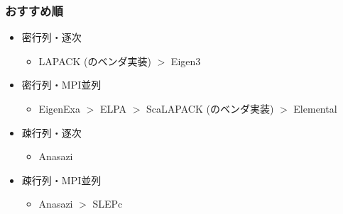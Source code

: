 \begin{frame}
  \frametitle{おすすめ順}
  \begin{itemize}
  \item 密行列・逐次
    \begin{itemize}
      \item LAPACK (のベンダ実装) $>$ Eigen3
    \end{itemize}
  \item 密行列・MPI並列
    \begin{itemize}
      \item EigenExa $>$ ELPA $>$ ScaLAPACK (のベンダ実装) $>$ Elemental
    \end{itemize}
  \item 疎行列・逐次
    \begin{itemize}
      \item Anasazi
    \end{itemize}
  \item 疎行列・MPI並列
    \begin{itemize}
      \item Anasazi $>$ SLEPc
    \end{itemize}
  \end{itemize}
\end{frame}

